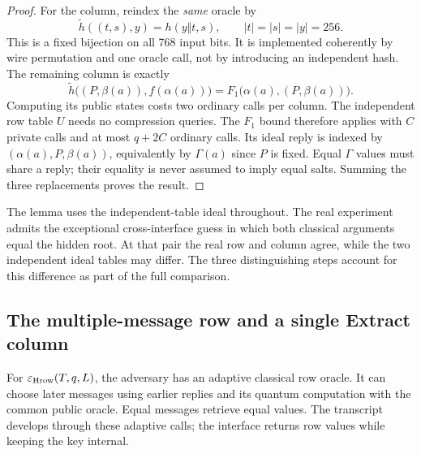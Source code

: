 \documentclass[pdflatex]{sn-jnl}
\theoremstyle{thmstyleone}
\theoremstyle{thmstylethree}
\theoremstyle{thmstyletwo}
\begin{document}
\begin{proof}
For the column, reindex the \emph{same} oracle by
\[
 \widetilde h((t,s),y)=h(y\Vert t,s),
 \qquad |t|=|s|=|y|=256.
\]
This is a fixed bijection on all 768 input bits. It is implemented
coherently by wire permutation and one oracle call, not by introducing an
independent hash. The remaining column is exactly
\[
 \widetilde h\bigl((P,\beta(a)),f(\alpha(a))\bigr)
   =F_1\bigl(\alpha(a),(P,\beta(a))\bigr).
\]
Computing its public states costs two ordinary calls per column. The
independent row table $U$ needs no compression queries.
The $F_1$ bound therefore applies with $C$ private calls and at most
$q+2C$ ordinary calls. Its ideal reply is indexed by
$(\alpha(a),P,\beta(a))$, equivalently by $\Gamma(a)$ since $P$ is fixed.
Equal $\Gamma$ values must share a reply; their equality is never assumed
to imply equal salts. Summing the three replacements proves the result.
\end{proof}

The lemma uses the independent-table ideal throughout. The real
experiment admits the exceptional cross-interface guess in which both
classical arguments equal the hidden root. At that pair the real row and
column agree, while the two independent ideal tables may differ. The
three distinguishing steps account for this difference as part of the
full comparison.

\subsection{The multiple-message row and a single Extract column}

For $\varepsilon_{\rm Hrow}(T,q,L)$, the adversary has an adaptive classical
row oracle. It can choose later messages using earlier replies and its
quantum computation with the common public oracle. Equal messages retrieve
equal values. The transcript develops through these adaptive calls;
the interface returns row values while keeping the key internal.
\end{document}
